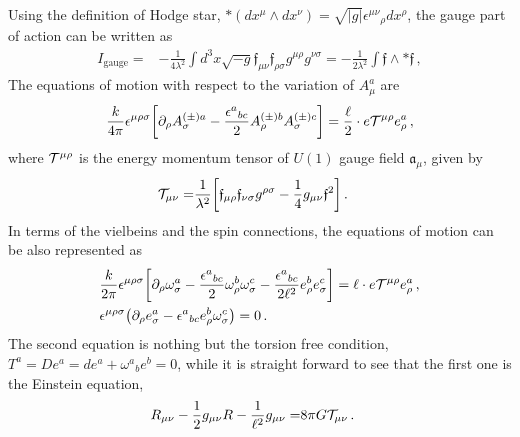 \documentclass[11pt]{article}
\numberwithin{equation}{section}
\begin{document}
Using the definition of Hodge star,
$* (dx^\mu \wedge dx^\nu ) = \sqrt{|g|} \epsilon^{\mu\nu}{}_\rho dx^\rho$, 
the gauge part of action can be written as
\begin{align}
  I_\text{gauge}=& 
-\frac{1}{4 \lambda^2} \int d^3 x \sqrt{-g}  \mathfrak{f}_{\mu\nu} \mathfrak{f}_{\rho\sigma} g^{\mu\rho} g^{\nu\sigma}
=
-\frac{1}{2\lambda^2} \int \mathfrak{f} \wedge *\mathfrak{f} \,,
\end{align}
The equations of motion with respect to the variation of $A_\mu^a$ are
\begin{align}
\frac{k}{4\pi} \epsilon^{\mu\rho\sigma}  \bigg[ \partial_\rho A^{(\pm)a}_\sigma 
- \frac{\epsilon^a{}_{bc}}{2} A^{(\pm)b}_\rho A^{(\pm)c}_\sigma \bigg] =
\frac{\ell}{2} \cdot e {\cal T}^{\mu\rho} e_\rho^a \,,
\label{eq:eom_cBTZ}
\end{align}
where ${\cal T}^{\mu\rho}$ is the energy momentum tensor of $U(1)$
gauge field $\mathfrak{a}_\mu$, given by 
\begin{align}
{\cal T}_{\mu\nu}=&  \frac{1}{\lambda^2} \bigg[ \mathfrak{f}_{\mu\rho}
\mathfrak{f}_{\nu\sigma} g^{\rho\sigma} -\frac{1}{4}g_{\mu\nu} \mathfrak{f}^2 \bigg] \,.
\end{align}
In terms of the vielbeins and the spin connections,
the equations of motion can be also represented as
\begin{align}
&  \frac{k}{2\pi} \epsilon^{\mu\rho\sigma} \bigg[
\partial_\rho \omega^a_\sigma 
- \frac{\epsilon^a{}_{bc}}{2} \omega^b_\rho \omega^c_\sigma
- \frac{\epsilon^a{}_{bc}}{2 \ell^2} e^b_\rho e^c_\sigma \bigg]
=\ell \cdot e {\cal T}^{\mu\rho} e_\rho^a \,,
\label{eq:CS_eom1}
\\
&
\epsilon^{\mu\rho\sigma} \big( \partial_\rho e^a_\sigma - \epsilon^a{}_{bc} e^b_\rho \omega^c_\sigma \big) =0 \,.
\label{eq:torsion_free_comp}
\end{align}
The second equation is nothing but the torsion free condition, $T^a=De^a=de^a+\omega^a{}_b e^b  =0$,
while it is straight forward to see that the first one is the Einstein equation,
\begin{align}
  R_{\mu\nu} - \frac{1}{2}g_{\mu\nu} R - \frac{1}{\ell^2} g_{\mu\nu}
  =& 8\pi G {\cal T}_{\mu\nu} \,.
\label{eq:Einstein_eq}
\end{align}
\end{document}
